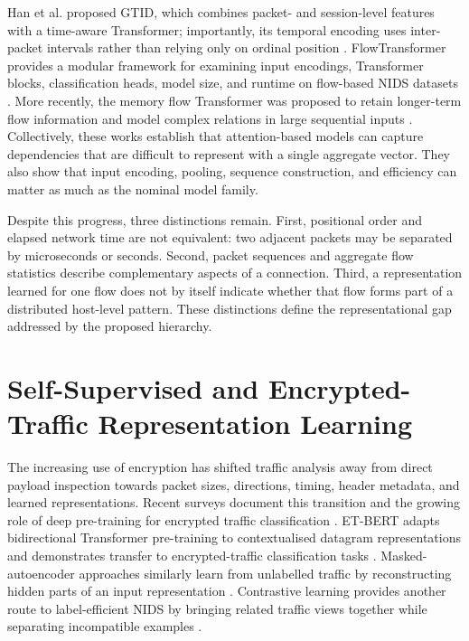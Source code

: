 \documentclass[11pt,fleqn]{report}
\begin{document}
Han et al. proposed GTID, which combines packet- and session-level features with a time-aware Transformer; importantly, its temporal encoding uses inter-packet intervals rather than relying only on ordinal position \cite{Han2023GTID}. FlowTransformer provides a modular framework for examining input encodings, Transformer blocks, classification heads, model size, and runtime on flow-based NIDS datasets \cite{Manocchio2024FlowTransformer}. More recently, the memory flow Transformer was proposed to retain longer-term flow information and model complex relations in large sequential inputs \cite{Jiang2025MFT}. Collectively, these works establish that attention-based models can capture dependencies that are difficult to represent with a single aggregate vector. They also show that input encoding, pooling, sequence construction, and efficiency can matter as much as the nominal model family.

Despite this progress, three distinctions remain. First, positional order and elapsed network time are not equivalent: two adjacent packets may be separated by microseconds or seconds. Second, packet sequences and aggregate flow statistics describe complementary aspects of a connection. Third, a representation learned for one flow does not by itself indicate whether that flow forms part of a distributed host-level pattern. These distinctions define the representational gap addressed by the proposed hierarchy.

\section{Self-Supervised and Encrypted-Traffic Representation Learning}
\label{subsec:rw_ssl_encrypted}

The increasing use of encryption has shifted traffic analysis away from direct payload inspection towards packet sizes, directions, timing, header metadata, and learned representations. Recent surveys document this transition and the growing role of deep pre-training for encrypted traffic classification \cite{Sharma2025EncryptedSurvey,Dong2025EncryptedPretrain}. ET-BERT adapts bidirectional Transformer pre-training to contextualised datagram representations and demonstrates transfer to encrypted-traffic classification tasks \cite{Lin2022ETBERT}. Masked-autoencoder approaches similarly learn from unlabelled traffic by reconstructing hidden parts of an input representation \cite{Zhao2024MAETraffic,2024MAETraffic}. Contrastive learning provides another route to label-efficient NIDS by bringing related traffic views together while separating incompatible examples \cite{Li2024Contrastive}.
\end{document}
